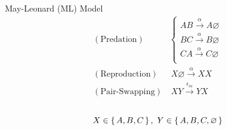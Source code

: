 \documentclass[aspectratio=169]{beamer}
\begin{document}
\begin{frame}
\begin{columns}
\begin{column}{0.5\textwidth}
                    May-Leonard (ML) Model
                        \begin{align*}
                            (\text{Predation}) & 
                            \left\{
                            \begin{matrix}
                            AB \xrightarrow{\alpha} A\varnothing\\
                            BC \xrightarrow{\alpha} B\varnothing\\
                            CA \xrightarrow{\alpha} C\varnothing\\
                            \end{matrix}
                            \right.\\
                            (\text{Reproduction}) & \ X \varnothing \xrightarrow{\alpha} XX \\
                            (\text{Pair-Swapping}) & \ XY \xrightarrow{\epsilon_m} YX 
                        \end{align*}
            \end{column}
        \end{columns}
        \begin{equation*}
            X \in \set{A, B, C}, \ Y \in \set{A, B, C, \varnothing}
        \end{equation*}
    \end{frame}
\end{document}
